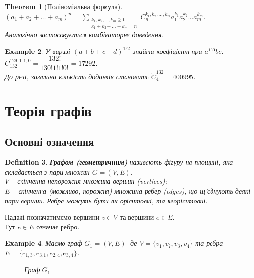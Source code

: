 \documentclass[a4paper, 14pt]{extarticle}
\theoremstyle{theoremdd}
\newtheorem{theorem}{Theorem}[subsection]
\theoremstyle{theoremdd}
\newtheorem{definition}[theorem]{Definition}
\theoremstyle{theoremdd}
\theoremstyle{theoremdd}
\theoremstyle{theoremdd}
\newtheorem{example}[theorem]{Example}
\theoremstyle{theoremdd}
\theoremstyle{theoremdd}
\theoremstyle{theoremdd}
\theoremstyle{theoremdd}
\theoremstyle{theoremdd}
\theoremstyle{theoremdd}
\theoremstyle{theoremdd}
\theoremstyle{theoremdd}
\theoremstyle{theoremdd}
\theoremstyle{theoremdd}
\begin{document}
\begin{theorem}[Поліноміальна формула]
$(a_1+a_2+\dots+a_m)^n = \displaystyle\sum_{\substack{k_1,k_2,\dots,k_m \geq 0 \\ k_1+k_2+\dots+k_m=n}} C_n^{k_1,k_2,\dots,k_m} a_1^{k_1} a_2^{k_2} \dots a_m^{k_m}$.\\
\textit{Аналогічно застосовується комбінаторне доведення.}
\end{theorem}

\begin{example}
У виразі $(a+b+c+d)^{132}$ знайти коефіцієнт при $a^{130}bc$.\\
$C_{132}^{129,1,1,0} = \dfrac{132!}{130!1!1!0!} = 17292$.\\
До речі, загальна кількість доданків становить $\tilde{C}_4^{132} = 400995$.
\end{example}
\newpage

\section{Теорія графів}
\subsection{Основні означення}
\begin{definition}
\textbf{Графом (геометричним)} називають фігуру на площині, яка складається з пари множин $G = (V,E)$.\\
$V$ -- скінченна непорожня множина вершин (vertices);\\
$E$ -- скінченна (можливо, порожня) множина ребер (edges), що щ'єднують деякі пари вершин. Ребра можуть бути як орієнтовні, та неорієнтовні.
\end{definition}

Надалі позначатимемо вершини $v \in V$ та вершини $e \in E$.\\
Тут $e \in E$ означає ребро.

\begin{example}
Маємо граф $G_1 = (V,E)$, де $V = \{v_1,v_2,v_3,v_4\}$ та ребра $E = \{e_{1,3}, e_{3,1}, e_{2,4},e_{3,4}\}$.
\begin{figure}[H]
\centering
{}
\caption*{Граф $G_1$}
\end{figure}
\end{example}
\end{document}
